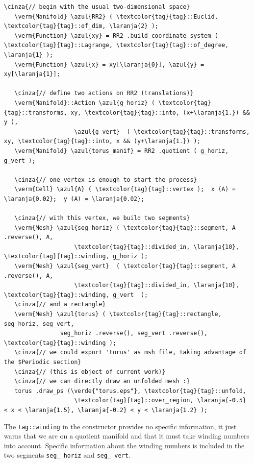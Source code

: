 \begin{Verbatim}[commandchars=\\\{\},formatcom=\small\tt,frame=single,
   label=parag-\ref{\numb section 7.\numb parag 4}.cpp,rulecolor=\color{moldura},
   baselinestretch=0.94,framesep=2mm                                            ]
   \cinza{// begin with the usual two-dimensional space}
   \verm{Manifold} \azul{RR2} ( \textcolor{tag}{tag}::Euclid, \textcolor{tag}{tag}::of_dim, \laranja{2} );
   \verm{Function} \azul{xy} = RR2 .build_coordinate_system ( \textcolor{tag}{tag}::Lagrange, \textcolor{tag}{tag}::of_degree, \laranja{1} );
   \verm{Function} \azul{x} = xy[\laranja{0}], \azul{y} = xy[\laranja{1}];

   \cinza{// define two actions on RR2 (translations)}
   \verm{Manifold}::Action \azul{g_horiz} ( \textcolor{tag}{tag}::transforms, xy, \textcolor{tag}{tag}::into, (x+\laranja{1.}) && y ),
                    \azul{g_vert}  ( \textcolor{tag}{tag}::transforms, xy, \textcolor{tag}{tag}::into, x && (y+\laranja{1.}) );
   \verm{Manifold} \azul{torus_manif} = RR2 .quotient ( g_horiz, g_vert );

   \cinza{// one vertex is enough to start the process}
   \verm{Cell} \azul{A} ( \textcolor{tag}{tag}::vertex );  x (A) = \laranja{0.02};  y (A) = \laranja{0.02};

   \cinza{// with this vertex, we build two segments}
   \verm{Mesh} \azul{seg_horiz} ( \textcolor{tag}{tag}::segment, A .reverse(), A,
                    \textcolor{tag}{tag}::divided_in, \laranja{10}, \textcolor{tag}{tag}::winding, g_horiz );
   \verm{Mesh} \azul{seg_vert}  ( \textcolor{tag}{tag}::segment, A .reverse(), A,
                    \textcolor{tag}{tag}::divided_in, \laranja{10}, \textcolor{tag}{tag}::winding, g_vert  );
   \cinza{// and a rectangle}
   \verm{Mesh} \azul{torus} ( \textcolor{tag}{tag}::rectangle, seg_horiz, seg_vert,
                seg_horiz .reverse(), seg_vert .reverse(), \textcolor{tag}{tag}::winding );
   \cinza{// we could export 'torus' as msh file, taking advantage of the $Periodic section}
   \cinza{// (this is object of current work)}
   \cinza{// we can directly draw an unfolded mesh :}
   torus .draw_ps (\verde{"torus.eps"}, \textcolor{tag}{tag}::unfold,
                    \textcolor{tag}{tag}::over_region, \laranja{-0.5} < x < \laranja{1.5}, \laranja{-0.2} < y < \laranja{1.2} );
\end{Verbatim}

The {\small\tt\textcolor{tag}{tag}::winding} in the constructor {\small\tt{}}
{\small\tt{}} provides no specific information, it just warns {\maniFEM} that
we are on a quotient manifold and that it must take winding numbers into account.
Specific information about the winding numbers is included in the two segments
{\small\tt seg\_\,horiz} and {\small\tt seg\_\,vert}.

